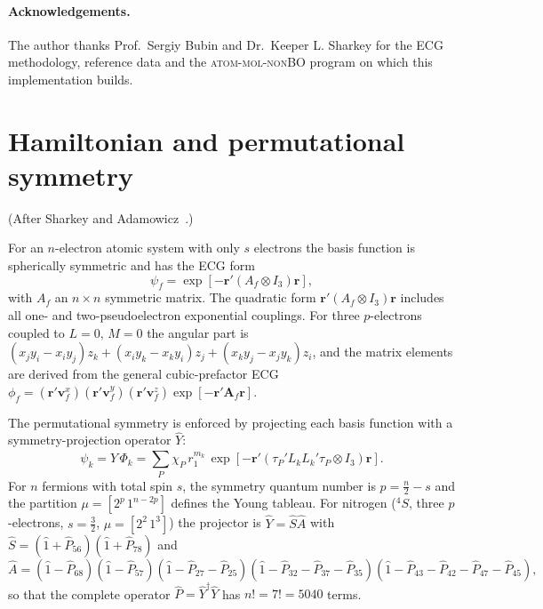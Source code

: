 \documentclass[11pt]{article}
\newcommand{\rvec}{\mathbf{r}}
\newcommand{\Ycal}{\hat{Y}}
\begin{document}
\paragraph{Acknowledgements.}
The author thanks Prof.\ Sergiy Bubin and Dr.\ Keeper L. Sharkey for the ECG methodology,
reference data and the \textsc{atom-mol-nonBO} program on which this
implementation builds.

\appendix

\section{Hamiltonian and permutational symmetry}
\label{app:ham}
(After Sharkey and Adamowicz~\cite{Sharkey2014}.)

For an $n$-electron atomic system with only $s$ electrons the basis function is
spherically symmetric and has the ECG form
\begin{equation}
\psi_f=\exp\!\left[-\rvec'(A_f\otimes I_3)\rvec\right],
\end{equation}
with $A_f$ an $n\times n$ symmetric matrix. The quadratic form
$\rvec'(A_f\otimes I_3)\rvec$ includes all one- and two-pseudoelectron
exponential couplings. For three $p$-electrons coupled to $L=0,\,M=0$ the
angular part is $(x_jy_i-x_iy_j)z_k+(x_iy_k-x_ky_i)z_j+(x_ky_j-x_jy_k)z_i$, and
the matrix elements are derived from the general cubic-prefactor ECG
$\phi_f=(\rvec'\mathbf{v}_f^x)(\rvec'\mathbf{v}_f^y)(\rvec'\mathbf{v}_f^z)\exp[-\rvec'\mathbf{A}_f\rvec]$.

The permutational symmetry is enforced by projecting each basis function with a
symmetry-projection operator $\Ycal$:
\begin{equation}
\psi_k=\Ycal\,\Phi_k=\sum_P \chi_P\, r_1^{m_k}\,
\exp\!\left[-\rvec'(\tau_P'L_kL_k'\tau_P\otimes I_3)\rvec\right].
\end{equation}
For $n$ fermions with total spin $s$, the symmetry quantum number is
$p=\tfrac{n}{2}-s$ and the partition $\mu=[2^p\,1^{n-2p}]$ defines the Young
tableau. For nitrogen ($^4S$, three $p$-electrons, $s=\tfrac32$,
$\mu=[2^2\,1^3]$) the projector is $\Ycal=\hat S\hat A$ with
$\hat S=(\hat 1+\hat P_{56})(\hat 1+\hat P_{78})$ and
\begin{equation}
\hat A=(\hat 1-\hat P_{68})(\hat 1-\hat P_{57})(\hat 1-\hat P_{27}-\hat P_{25})
(\hat 1-\hat P_{32}-\hat P_{37}-\hat P_{35})
(\hat 1-\hat P_{43}-\hat P_{42}-\hat P_{47}-\hat P_{45}),
\end{equation}
so that the complete operator $\hat P=\Ycal^{\dagger}\Ycal$ has
$n!=7!=5040$ terms.
\end{document}
